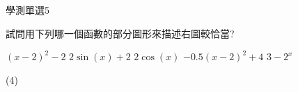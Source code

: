 \begin{QUESTIONS}
\begin{QUESTION}
\begin{QANS}
        \end{QANS}
        \begin{QSOLLIST}
        \end{QSOLLIST}
        \begin{QEMPTYSPACE}
        \end{QEMPTYSPACE}
    \end{QUESTION}
    \begin{QUESTION}
        \begin{ExamInfo}{91}{學測}{單選}{5}
        \end{ExamInfo}
        \begin{ExamAnsRateInfo}{52}{82}{54}{20}
        \end{ExamAnsRateInfo}
        \begin{QBODY}
            試問用下列哪一個函數的部分圖形來描述右圖較恰當?
            \begin{QOPS}
            \QOP $(x-2)^{2}-2$  
            \QOP $2\sin(x)+2$
            \QOP $2\cos(x)$ 
            \QOP $-0.5(x-2)^{2}+4$ 
            \QOP $3-2^{x}$ 
            \end{QOPS}
        \end{QBODY}
        \begin{QFROMS}
        \end{QFROMS}
        \begin{QTAGS}\end{QTAGS}
        \begin{QANS}
            (4)
        \end{QANS}
        \begin{QSOLLIST}
        \end{QSOLLIST}
        \begin{QEMPTYSPACE}

\end{QEMPTYSPACE}
\end{QUESTION}
\end{QUESTIONS}
